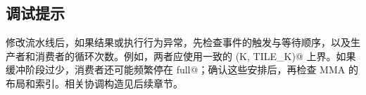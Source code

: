 \subsection*{调试提示}

修改流水线后，如果结果或执行行为异常，先检查事件的触发与等待顺序，以及生产者和消费者的循环次数。例如，两者应使用一致的 \co@cdiv(K, TILE_K)@ 上界。如果缓冲阶段过少，消费者还可能频繁停在 \co@wait full@；确认这些安排后，再检查 MMA 的布局和索引。相关协调构造见后续章节。
